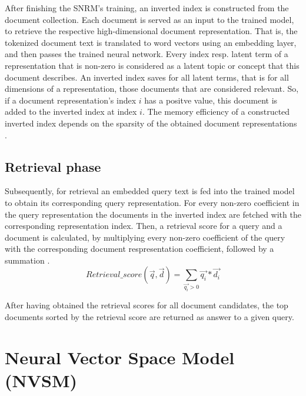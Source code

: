 After finishing the SNRM's training, an inverted index is constructed
    from the document collection.
Each document is served as an input to the trained model, to retrieve
    the respective high-dimensional document representation.
That is, the tokenized document text is translated to word vectors
    using an embedding layer, and then passes the trained 
    neural network.
Every index resp. latent term of a representation that is non-zero
    is considered as a latent topic or concept that this document describes.
An inverted index saves for all latent terms, that is for all dimensions
    of a representation, those documents that are considered relevant.
So, if a document representation's index $i$ has a positve value,
    this document is added to the inverted index at index $i$.
The memory efficiency of a constructed inverted index depends on the
    sparsity of the obtained document representations
    \cite{zamani:2018:from-neural-reranking-to-neural-ranking}.

\subsection*{Retrieval phase}

Subsequently, for retrieval an embedded query text is fed into the trained
    model to obtain its corresponding query representation.
For every non-zero coefficient in the query representation the
    documents in the inverted index are fetched with the corresponding
    representation index.
Then, a retrieval score for a query and a document is calculated,
    by multiplying every non-zero coefficient of the query with the corresponding
    document respresentation coefficient, followed by a summation
    \cite{zamani:2018:from-neural-reranking-to-neural-ranking}.
\[
Retrieval\_score(\vec{q}, \vec{d}) = \sum_{\vec{q_i} > 0} \vec{q_i} * \vec{d_i}
\]

After having obtained the retrieval scores for all document candidates,
    the top documents sorted by the retrieval score are returned as 
    answer to a given query.

\section{Neural Vector Space Model (NVSM)}

